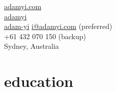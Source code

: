 \documentclass[hidelinks__VERSION__]{adamyi-cv}
\begin{document}

{\faGlobe \hspace{0.1em} \href{https://www.adamyi.com}{adamyi.com}\\
\faGithub \hspace{0.1em} \href{https://github.com/adamyi}{adamyi}\\
\faLinkedin \hspace{0.1em} \href{https://linkedin.com/in/adam-yi}{adam-yi}}
{\href{mailto:i@adamyi.com}{i@adamyi.com} (preferred)\\
+61 432 070 150 (backup)\\
Sydney, Australia}




\section{education}
\end{document}
